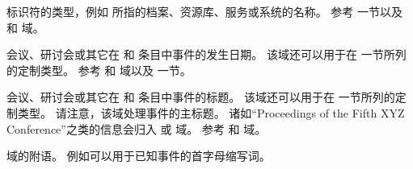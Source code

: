 \begin{fieldlist}

 标识符的类型，例如  所指的档案、资源库、服务或系统的名称。
参考  一节以及  和  域。




会议、研讨会或其它在  和  条目中事件的发生日期。
该域还可以用于在  一节所列的定制类型。
参考  和  域以及  一节。




会议、研讨会或其它在  和  条目中事件的标题。
该域还可以用于在  一节所列的定制类型。
请注意，该域处理事件的主标题。
诸如“Proceedings of the Fifth XYZ Conference”之类的信息会归入  或  域。
参考  和  域。




 域的附语。
例如可以用于已知事件的首字母缩写词。




\end{fieldlist}
